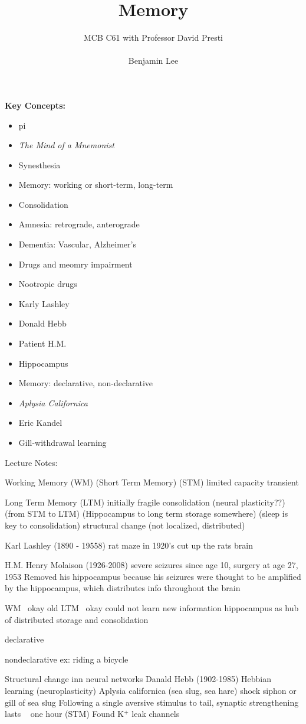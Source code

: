 \documentclass{article}
\title{Memory}
\author{MCB C61 with Professor David Presti \\ \\ Benjamin Lee}
\begin{document}
\maketitle

\textbf{Key Concepts:}
\begin{itemize}
    \item pi
    \item \textit{The Mind of a Mnemonist}
    \item Synesthesia
    \item Memory: working or short-term, long-term
    \item Consolidation
    \item Amnesia: retrograde, anterograde
    \item Dementia: Vascular, Alzheimer's
    \item Drugs and meomry impairment
    \item Nootropic drugs
    \item Karly Lashley
    \item Donald Hebb
    \item Patient H.M.
    \item Hippocampus
    \item Memory: declarative, non-declarative
    \item \textit{Aplysia Californica}
    \item Eric Kandel
    \item Gill-withdrawal learning
\end{itemize}



\newpage
Lecture Notes:

Working Memory (WM) (Short Term Memory) (STM)
limited capacity transient

Long Term Memory (LTM)
initially fragile
consolidation (neural plasticity??) (from STM to LTM) (Hippocampus to long term storage somewhere) (sleep is key to consolidation) 
structural change (not localized, distributed)

Karl Lashley (1890 - 19558) 
rat maze in 1920's
cut up the rats brain


H.M. Henry Molaison (1926-2008)
severe seizures since age 10, surgery at age 27, 1953
Removed his hippocampus because his seizures were thought to be amplified by the hippocampus, which distributes info throughout the brain

WM ~okay
old LTM ~okay
could not learn new information
hippocampus as hub of distributed storage and consolidation

declarative  

nondeclarative
ex: riding a bicycle

Structural change inn neural networks 
Danald Hebb (1902-1985) 
Hebbian learning (neuroplasticity) 
Aplysia californica (sea slug, sea hare) 
shock siphon or gill of sea slug
Following a single aversive stimulus to tail, synaptic strengthening lasts ~ one hour (STM) 
Found K$^+$ leak channels 
\end{document}

